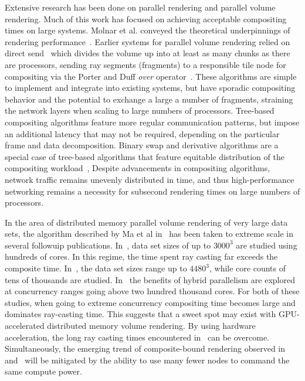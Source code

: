 Extensive research has been done on parallel rendering and parallel
volume rendering.  Much of this work has focused on achieving
acceptable compositing times on large systems.  Molnar et al. conveyed
the theoretical underpinnings of rendering
performance~\cite{Molnar:1994:ParRen}.  Earlier systems for parallel
volume rendering relied on direct send~\cite{Hsu:1993:SRC,
Ma:1993:DSend} which divides the volume up into at least as many
chunks as there are processors, sending ray segments (fragments) to a
responsible tile node for compositing via the Porter and Duff
\emph{over} operator~\cite{PorterDuff:1984:Compositing}.  These
algorithms are simple to implement and integrate into existing systems,
but have sporadic compositing behavior and the potential to exchange a
large a number of fragments, straining the network layers when scaling
to large numbers of processors.  Tree-based compositing algorithms
feature more regular communication patterns, but impose an additional
latency that may not be required, depending on the particular frame
and data decomposition.  Binary swap and derivative algorithms are a
special case of tree-based algorithms that feature
equitable distribution of the compositing
workload~\cite{Ma:1994:BinarySwap}, Despite advancements in compositing
algorithms, network traffic remains unevenly distributed in time, and
thus high-performance networking remains a necessity for subsecond
rendering times on large numbers of processors.

In the area of distributed memory parallel volume rendering of very
large data sets, the algorithm described by Ma et al
in~\cite{Ma:1993:???} has been taken to extreme scale in several
followuip publications.  In~\cite{Childs:2006:???}, data set sizes of
up to $3000^3$ are studied using hundreds of cores.  In this regime,
the time spent ray casting far exceeds the composite time.
In~\cite{PYRM:2008:???, PYR:2009:???}, the data set sizes range up to
$4480^3$, while core counts of tens of thousands are studied.
In~\cite{Howison:2010:HybridVR} the benefits of hybrid parallelism
are explored at concurrency ranges going above two hundred thousand
cores.  For both of these studies, when going to extreme concurrency
compositing time becomes large and dominates ray-casting time.  This
suggests that a sweet spot may exist with GPU-accelerated distributed
memory volume rendering.  By using hardware acceleration, the long ray
casting times encountered in~\cite{Childs:2006:ScalableVR} can be overcome.
Simultaneously, the emerging trend of composite-bound rendering
observed in~\cite{PYR:2009:???} and~\cite{Howison:2010:HybridVR} will
be mitigated by the ability to use many fewer nodes to command the same
compute power.

